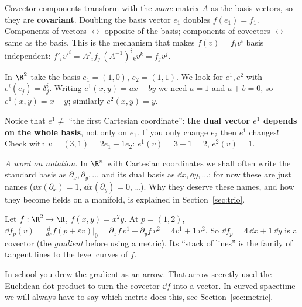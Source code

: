\begin{intuition}[{covariant = changes like the basis}]
Covector components transform with the \emph{same} matrix $A$ as the basis vectors, so they are \textbf{covariant}. Doubling the basis vector $e_1$ doubles $f(e_1)=f_1$. Components of vectors $\leftrightarrow$ opposite of the basis; components of covectors $\leftrightarrow$ same as the basis. This is the mechanism that makes $f(v)=f_iv^i$ basis independent:
$f'_iv'^i=A^j{}_if_j\,(A^{-1})^i{}_kv^k=f_jv^j$.
\end{intuition}

\begin{example}
In $\R^2$ take the basis $e_1=(1,0)$, $e_2=(1,1)$. We look for $e^{1},e^{2}$ with $e^{i}(e_j)=\delta^i_j$. Writing $e^{1}(x,y)=ax+by$ we need $a=1$ and $a+b=0$, so $e^{1}(x,y)=x-y$; similarly $e^{2}(x,y)=y$.

Notice that $e^{1}\neq$ ``the first Cartesian coordinate'': \textbf{the dual vector $e^{1}$ depends on the whole basis}, not only on $e_1$. If you only change $e_2$ then $e^{1}$ changes! Check with $v=(3,1)=2e_1+1e_2$: $e^{1}(v)=3-1=2$, $e^{2}(v)=1$. \checkmark
\end{example}

\emph{A word on notation.} In $\R^n$ with Cartesian coordinates we shall often write the standard basis as
$\partial_x,\partial_y,\dots$ and its dual basis as $\dd x,\dd y,\dots$; for now these are just names
($\dd x(\partial_x)=1$, $\dd x(\partial_y)=0$, \dots). Why they deserve these names, and how they become fields
on a manifold, is explained in Section~\ref{sec:trio}.

\begin{example}
Let $f:\R^2\to\R$, $f(x,y)=x^2y$. At $p=(1,2)$, $\dd f_p(v)=\frac{d}{d\varepsilon}f(p+\varepsilon v)|_0=\partial_xf\,v^1+\partial_yf\,v^2=4v^1+1\,v^2$. So $\dd f_p=4\,\dd x+1\,\dd y$ is a covector (the \emph{gradient} before using a metric). Its ``stack of lines'' is the family of tangent lines to the level curves of $f$.
\end{example}

\begin{pitfall}
In school you drew the gradient as an arrow. That arrow secretly used the Euclidean dot product to turn the covector $\dd f$ into a vector. In curved spacetime we will always have to say which metric does this, see Section~\ref{sec:metric}.
\end{pitfall}
